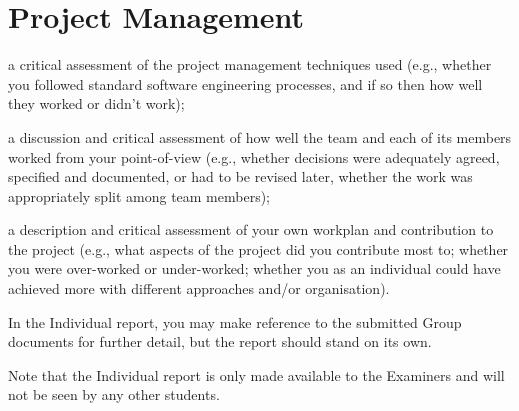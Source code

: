 \section{Project Management}
a critical assessment of the project management techniques used (e.g.,
whether you followed standard software engineering processes, and if so then
how well they worked or didn't work);

a discussion and critical assessment of how well the team and each of its
members worked from your point-of-view (e.g., whether decisions were
adequately agreed, specified and documented, or had to be revised later,
whether the work was appropriately split among team members);

a description and critical assessment of your own workplan and contribution
to the project (e.g., what aspects of the project did you contribute most
to; whether you were over-worked or under-worked; whether you as an
individual could have achieved more with different approaches and/or
organisation).

In the Individual report, you may make reference to the submitted Group
documents for further detail, but the report should stand on its own.

Note that the Individual report is only made available to the Examiners and will
not be seen by any other students.



